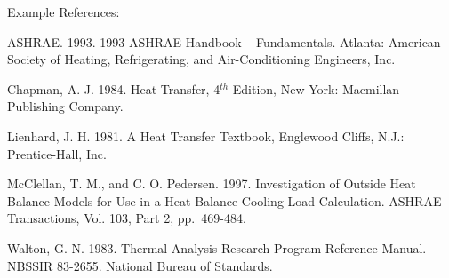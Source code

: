 Example References:

ASHRAE. 1993. 1993 ASHRAE Handbook -- Fundamentals. Atlanta: American Society of Heating, Refrigerating, and Air-Conditioning Engineers, Inc.

Chapman, A. J. 1984. Heat Transfer, 4\(^{th}\) Edition, New York: Macmillan Publishing Company.

Lienhard, J. H. 1981. A Heat Transfer Textbook, Englewood Cliffs, N.J.: Prentice-Hall, Inc.

McClellan, T. M., and C. O. Pedersen. 1997. Investigation of Outside Heat Balance Models for Use in a Heat Balance Cooling Load Calculation. ASHRAE Transactions, Vol. 103, Part 2, pp.~469-484.

Walton, G. N. 1983. Thermal Analysis Research Program Reference Manual. NBSSIR 83-2655. National Bureau of Standards.
